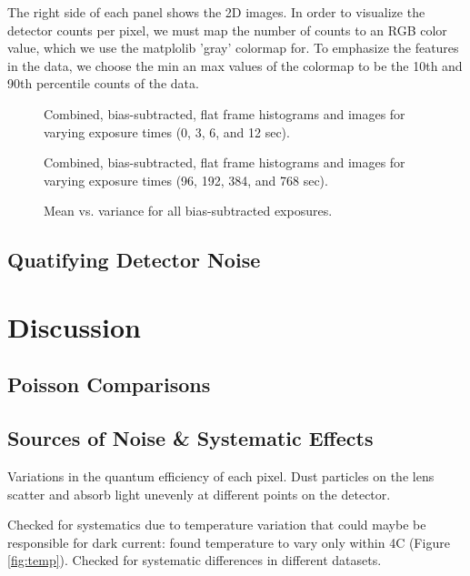 \documentclass[preprint]{aastex62}
\begin{document}
The right side of each panel shows the 2D images. In order to visualize the detector counts per pixel, we must map the number of counts to an RGB color value, which we use the matplolib 'gray' colormap for. To emphasize the features in the data, we choose the min an max values of the colormap to be the 10th and 90th percentile counts of the data.


\begin{figure}[ht]
\caption{Combined, bias-subtracted, flat frame histograms and images for varying exposure times (0, 3, 6, and 12 sec). \label{fig:flats1}}
\end{figure}
\begin{figure}[ht]
\caption{Combined, bias-subtracted, flat frame histograms and images for varying exposure times (96, 192, 384, and 768 sec). \label{fig:flats2}}
\end{figure}

\begin{figure}[ht]
\caption{Mean vs. variance for all bias-subtracted exposures.} \label{fig:mean_var}
\end{figure}

\subsection{Quatifying Detector Noise}

\section{Discussion}
\subsection{Poisson Comparisons}

\subsection{Sources of Noise \& Systematic Effects}
Variations in the quantum efficiency of each pixel.
Dust particles on the lens scatter and absorb light unevenly at different points on the detector.

Checked for systematics due to temperature variation that could maybe be responsible for dark current: found temperature to vary only within 4C (Figure \ref{fig:temp}). Checked for systematic differences in different datasets. 
\end{document}
